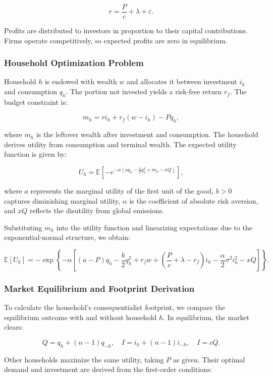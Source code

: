 \documentclass[12pt,a4paper]{article}%
\begin{document}
\[
r = \frac{P}{c} + \lambda + \varepsilon.
\]

Profits are distributed to investors in proportion to their capital contributions. Firms operate competitively, so expected profits are zero in equilibrium.

\subsubsection{Household Optimization Problem}

Household $h$ is endowed with wealth $w$ and allocates it between investment $i_h$ and consumption $q_h$. The portion not invested yields a risk-free return $r_f$. The budget constraint is:

\[
m_h = r i_h + r_f(w - i_h) - P q_h,
\]

where $m_h$ is the leftover wealth after investment and consumption. The household derives utility from consumption and terminal wealth. The expected utility function is given by:

\[
U_h = \mathbb{E} \left[ -e^{-\alpha \left( a q_h - \frac{b}{2}q_h^2 + m_h - xQ \right)} \right],
\]

where $a$ represents the marginal utility of the first unit of the good, $b > 0$ captures diminishing marginal utility, $\alpha$ is the coefficient of absolute risk aversion, and $xQ$ reflects the disutility from global emissions.

Substituting $m_h$ into the utility function and linearizing expectations due to the exponential-normal structure, we obtain:

\[
\mathbb{E}[U_h] = -\exp \left\{ -\alpha \left[ (a - P)q_h - \frac{b}{2}q_h^2 + r_f w + \left( \frac{P}{c} + \lambda - r_f \right)i_h - \frac{\alpha}{2} \sigma^2 i_h^2 - xQ \right] \right\}.
\]

\subsubsection{Market Equilibrium and Footprint Derivation}

To calculate the household's consequentialist footprint, we compare the equilibrium outcome with and without household $h$. In equilibrium, the market clears:

\[
Q = q_h + (n - 1) q_{-h}, \quad I = i_h + (n - 1) i_{-h}, \quad I = cQ.
\]

Other households maximize the same utility, taking $P$ as given. Their optimal demand and investment are derived from the first-order conditions:
\end{document}
